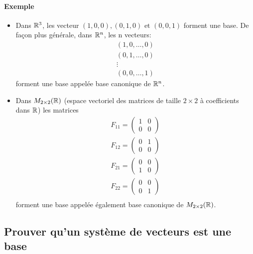 \paragraph{Exemple}
\begin{itemize}
  \item Dans $\mathbb{R}^3$, les vecteur $(1, 0, 0), (0, 1, 0) \text{ et } (0, 0, 1)$ forment une base.  De façon plus générale, dans $\mathbb{R}^n$, les n vecteurs:
    \begin{eqnarray*}
      (1, 0, \ldots, 0) \\
      (0, 1, \ldots, 0) \\
      \vdots \\
      (0, 0, \ldots, 1) 
    \end{eqnarray*}
    forment une base appelée base canonique de $\mathbb{R}^n$.
  \item Dans $M_{2\times 2}(\mathbb{R})$ (espace vectoriel des matrices de taille $2\times 2$ à coefficients dans $\mathbb{R}$) les matrices 
    \begin{eqnarray*}
      F_{11} = \begin{pmatrix} 1 & 0 \\ 0 & 0 \end{pmatrix} \\
      F_{12} = \begin{pmatrix} 0 & 1 \\ 0 & 0 \end{pmatrix} \\
      F_{21} = \begin{pmatrix} 0 & 0 \\ 1 & 0 \end{pmatrix} \\
      F_{22} = \begin{pmatrix} 0 & 0 \\ 0 & 1 \end{pmatrix} \\
    \end{eqnarray*}
    forment une base appelée également base canonique de $M_{2 \times 2}(\mathbb{R})$.
\end{itemize}

%
\subsection{Prouver qu'un système de vecteurs est une base}
%
